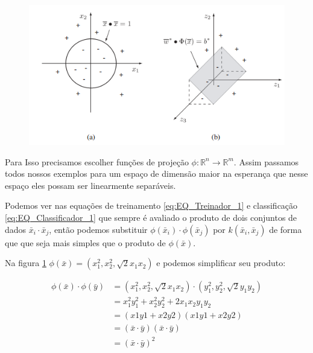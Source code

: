 \begin{figure}
  \centering
  \includegraphics[width=1\textwidth]{imagens/svm_5.png}
  \label{fig:LABEL_FIG_5}
\end{figure}

Para Isso precisamos escolher funções de projeção $ \phi:\mathbb{R}^n\rightarrow\mathbb{R}^m$. Assim passamos todos nossos exemplos para um espaço de dimensão maior na esperança que nesse espaço eles possam ser linearmente separáveis. 

Podemos ver nas equações de treinamento \ref{eq:EQ_Treinador_1} e classificação \ref{eq:EQ_Classificador_1} que sempre é avaliado o produto de dois conjuntos de dados $\bar{x}_i\cdot\bar{x}_j$, então podemos substituir $\phi(\bar{x}_i) \cdot \phi ( \bar{x}_j )$ por $k(\bar{x}_i,\bar{x}_j)$ de forma que que seja mais simples que o produto de $\phi(\bar{x})$.

Na figura \ref{fig:LABEL_FIG_5} $\phi(\bar{x})=(x_1^2,x_2^2,\sqrt{2}x_1x_2)$ e podemos simplificar seu produto:

\begin{equation}
\begin{split}
\phi(\bar{x})\cdot \phi(\bar{y}) &= (x_1^2,x_2^2,\sqrt{2}x_1x_2) \cdot (y_1^2,y_2^2,\sqrt{2}y_1y_2) \\
&=x_1^2y_1^2+x_2^2y_2^2+2x_1x_2y_1y_2 \\
&=(x1y1+x2y2)(x1y1+x2y2) \\
&=(\bar{x}\cdot\bar{y})(\bar{x}\cdot\bar{y}) \\
&=(\bar{x}\cdot\bar{y})^2
\end{split}
\end{equation}

